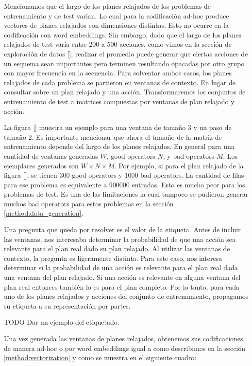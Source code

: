 Mencionamos que el largo de los planes relajados de los problemas de
entrenamiento y de test varian. Lo cual para la codificación ad-hoc produce
vectores de planes relajados con dimensiones distintas. Esto no ocurre en la
codificación con word embeddings. Sin embargo, dado que el largo de los planes
relajados de test varía entre 200 a 500 acciones, como vimos en la sección de
exploración de datos \ref{}, realizar el promedio puede generar que ciertas
acciones de un esquema sean importantes pero terminen resultando opacadas por
otro grupo con mayor frecuencia en la secuencia. Para solventar ambos casos, los
planes relajados de cada problema se partieron en ventanas de contexto. En lugar
de consultar sobre un plan relajado y una acción. Transformaremos los conjuntos
de entrenamiento de test a matrices compuestas por ventanas de plan relajado y
acción.

La figura \ref{} muestra un ejemplo para una ventana de tamaño 3 y un paso de
tamaño 2. Es importante mencionar que ahora el tamaño de la matriz de
entrenamiento depende del largo de los planes relajados. En general para una
cantidad de ventanas generadas $W$, good operators $N$, y bad operators $M$. Los
ejemplares generados son $W \times N \times M$. Por ejemplo, si para el plan
relajado de la figura \ref{}, se tienen 300 good operators y 1000 bad operators.
La cantidad de filas para ese problema es equivalente a $900000$ entradas. Esto
es mucho peor para los problemas de test. Es una de las limitaciones la cual
tampoco se pudieron generar muchos bad operators para estos problemas en la
sección \ref{method:data_generation}.

Una pregunta que queda por resolver es el valor de la etiqueta. Antes de incluir
las ventanas, nos interesaba determinar la probabilidad de que una acción sea
relevante para el plan real dado su plan relajado. Al utilizar las ventanas de
contexto, la pregunta es ligeramente distinta. Para este caso, nos interesa
determinar si la probabilidad de una acción es relevante para el plan real dada
una ventana del plan relajado. Si una acción es relevante en alguna ventana del
plan real entonces también lo es para el plan completo. Por lo tanto, para cada
uno de los planes relajados y acciones del conjunto de entrenamiento, propagamos
su etiqueta a su representación por partes.

TODO Dar un ejemplo del etiquetado.

Una vez generada las ventanas de planes relajados, obtenemos sus codificaciones
de manera ad-hoc o por word embeddings igual a como describimos en la sección
\ref{method:vectorization} y como se muestra en el siguiente cuadro:

